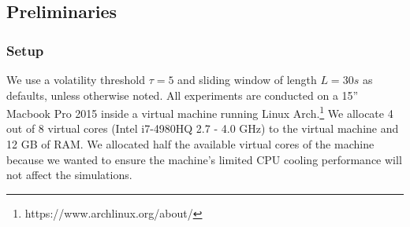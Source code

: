 \documentclass[abstracton,12pt]{scrartcl}
\theoremstyle{definition}
\begin{document}
\vspace{-0.4cm}

\subsection{Preliminaries}

\subsubsection{Setup}

\label{sec:setup}

We use a volatility threshold $\tau = 5$ and sliding window of length $L = 30s$ as defaults,
unless otherwise noted.
All experiments are conducted on a 15'' Macbook Pro 2015 inside
a virtual machine running Linux Arch.\footnote{https://www.archlinux.org/about/}
We allocate 4 out of 8 virtual cores (Intel i7-4980HQ 2.7 - 4.0 GHz) to the virtual
machine and 12 GB of RAM. We allocated half the available virtual cores of the machine
because we wanted to ensure the machine's limited CPU cooling performance will not affect the simulations.
\end{document}
